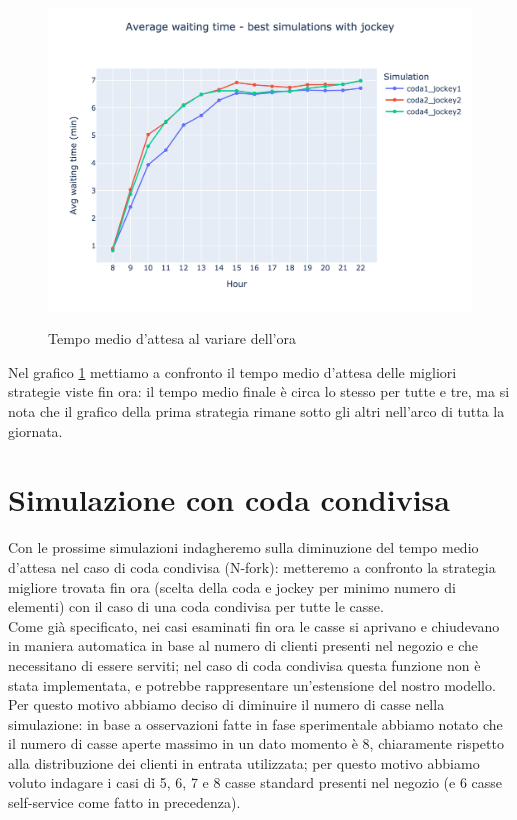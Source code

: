 \begin{figure}[H]
	\centering
	\includegraphics[width=12cm]{"images/results/avg_wt_jockey_best.png"}
	\label{fig:avg_wt_jockey_best}
	\caption{Tempo medio d'attesa al variare dell'ora}
\end{figure}

Nel grafico \ref{fig:avg_wt_jockey_best} mettiamo a confronto il tempo medio d'attesa delle migliori strategie viste fin ora: il tempo medio finale è circa lo stesso per tutte e tre, ma si nota che il grafico della prima strategia rimane sotto gli altri nell'arco di tutta la giornata.

\section{Simulazione con coda condivisa}

Con le prossime simulazioni indagheremo sulla diminuzione del tempo medio d'attesa nel caso di coda condivisa (N-fork): metteremo a confronto la strategia migliore trovata fin ora (scelta della coda e jockey per minimo numero di elementi) con il caso di una coda condivisa per tutte le casse. \\
Come già specificato, nei casi esaminati fin ora le casse si aprivano e chiudevano in maniera automatica in base al numero di clienti presenti nel negozio e che necessitano di essere serviti; nel caso di coda condivisa questa funzione non è stata implementata, e potrebbe rappresentare un'estensione del nostro modello. Per questo motivo abbiamo deciso di diminuire il numero di casse nella simulazione: in base a osservazioni fatte in fase sperimentale abbiamo notato che il numero di casse aperte massimo in un dato momento è 8, chiaramente rispetto alla distribuzione dei clienti in entrata utilizzata; per questo motivo abbiamo voluto indagare i casi di 5, 6, 7 e 8 casse standard presenti nel negozio (e 6 casse self-service come fatto in precedenza).


